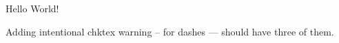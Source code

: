 \documentclass{article}
\begin{document}
Hello World!

Adding intentional chktex warning -- for dashes --- should have three of them.

\end{document}
